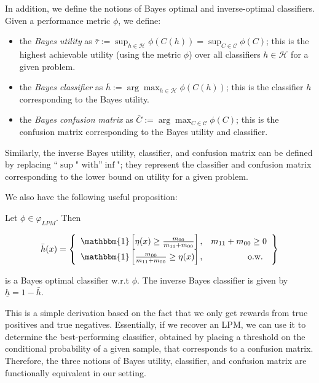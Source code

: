 \documentclass[
  letterpaper,
  DIV=11,
  numbers=noendperiod,
  oneside]{scrreprt}
\theoremstyle{remark}
\begin{document}
In addition, we define the notions of Bayes optimal and inverse-optimal
classifiers. Given a performance metric \(\phi\), we define:

\begin{itemize}
\item
  the \emph{Bayes utility} as
  \(\bar{\tau} := \sup_{h \in \mathcal{H}} \phi(C(h)) = \sup_{C \in \mathcal{C}} \phi(C)\); this is the highest achievable
  utility (using the metric \(\phi\)) over all classifiers
  \(h \in \mathcal{H}\) for a given problem.
\item
  the \emph{Bayes classifier} as
  \(\bar{h} := \arg \max_{h \in \mathcal{H}} \phi(C(h))\); this is the
  classifier \(h\) corresponding to the Bayes utility.
\item
  the \emph{Bayes confusion matrix} as
  \(\bar{C} := \arg \max_{C \in \mathcal{C}} \phi(C)\); this is the
  confusion matrix corresponding to the Bayes utility and classifier.
\end{itemize}

Similarly, the inverse Bayes utility, classifier, and confusion matrix
can be defined by replacing ``\(\sup\)" with''\(\inf\)"; they represent
the classifier and confusion matrix corresponding to the lower bound on
utility for a given problem.

We also have the following useful proposition:

Let \(\phi \in \varphi_{L P M}\). Then

\[\bar{h}(x)=\left\{\begin{array}{lr}
\mathbbm{1}\left[\eta(x) \geq \frac{m_{00}}{m_{11}+m_{00}}\right], & m_{11}+m_{00} \geq 0 \\
\mathbbm{1}\left[\frac{m_{00}}{m_{11}+m_{00}} \geq \eta(x)\right], & \text { o.w. }
\end{array}\right\}\]

is a Bayes optimal classifier w.r.t \(\phi\). The inverse Bayes
classifier is given by \(\underline{h}=1-\bar{h}\).

This is a simple derivation based on the fact that we only get rewards
from true positives and true negatives. Essentially, if we recover an
LPM, we can use it to determine the best-performing classifier, obtained
by placing a threshold on the conditional probability of a given sample,
that corresponds to a confusion matrix. Therefore, the three notions of
Bayes utility, classifier, and confusion matrix are functionally
equivalent in our setting.
\end{document}
